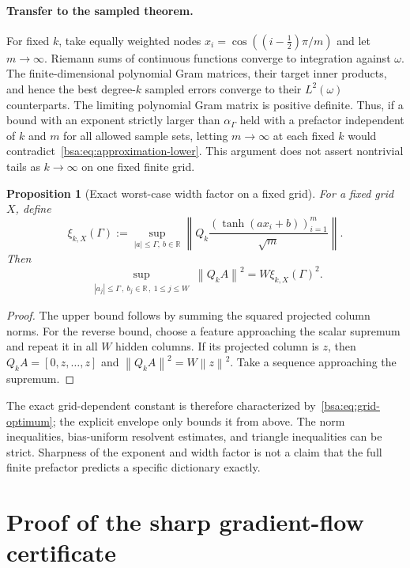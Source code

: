 \documentclass[11pt,letterpaper]{article}
\newcommand{\bsaNorm}[1]{\left\lVert #1\right\rVert}
\newcommand{\bsaRR}{\mathbb R}
\newtheorem{bsaProposition}{Proposition}[section]
\theoremstyle{remark}
\theoremstyle{plain}
\begin{document}
\paragraph{Transfer to the sampled theorem.}
For fixed $k$, take equally weighted nodes $x_i=\cos((i-\tfrac12)\pi/m)$ and let $m\to\infty$. Riemann sums of continuous functions converge to integration against $\omega$. The finite-dimensional polynomial Gram matrices, their target inner products, and hence the best degree-$k$ sampled errors converge to their $L^2(\omega)$ counterparts. The limiting polynomial Gram matrix is positive definite. Thus, if a bound with an exponent strictly larger than $\alpha_\Gamma$ held with a prefactor independent of $k$ and $m$ for all allowed sample sets, letting $m\to\infty$ at each fixed $k$ would contradict~\eqref{bsa:eq:approximation-lower}. This argument does not assert nontrivial tails as $k\to\infty$ on one fixed finite grid.

\begin{bsaProposition}[Exact worst-case width factor on a fixed grid]
\label{bsa:prop:width-sharp}
For a fixed grid $X$, define
\begin{equation}
 \xi_{k,X}(\Gamma)
 :=\sup_{|a|\le\Gamma,\ b\in\bsaRR}
 \left\|Q_k\frac{(\tanh(ax_i+b))_{i=1}^m}{\sqrt m}\right\|.
 \label{bsa:eq:grid-optimum}
\end{equation}
Then
\begin{equation}
 \sup_{\substack{|a_j|\le\Gamma\,,\ b_j\in\bsaRR\,,\ 1\le j\le W}}
 \bsaNorm{Q_kA}^2=W\xi_{k,X}(\Gamma)^2.
 \label{bsa:eq:width-exact}
\end{equation}
\end{bsaProposition}
\begin{proof}
The upper bound follows by summing the squared projected column norms. For the reverse bound, choose a feature approaching the scalar supremum and repeat it in all $W$ hidden columns. If its projected column is $z$, then $Q_kA=[0,z,\ldots,z]$ and $\bsaNorm{Q_kA}^2=W\bsaNorm z^2$. Take a sequence approaching the supremum.
\end{proof}

The exact grid-dependent constant is therefore characterized by~\eqref{bsa:eq:grid-optimum}; the explicit envelope only bounds it from above. The norm inequalities, bias-uniform resolvent estimates, and triangle inequalities can be strict. Sharpness of the exponent and width factor is not a claim that the full finite prefactor predicts a specific dictionary exactly.

\section{Proof of the sharp gradient-flow certificate}
\label{bsa:sec:time-proof}
\end{document}
